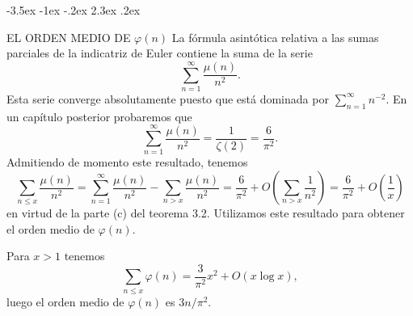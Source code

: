 \documentclass[12pt,a4paper]{book}
\makeatletter
\renewcommand\section{\@startsection{section}{1}{\z@}%
  {-3.5ex \@plus -1ex \@minus -.2ex}%
  {2.3ex \@plus .2ex}%
  {\normalfont\Large\bfseries\raggedright}}
\makeatother
\begin{document}
    \section{EL ORDEN MEDIO DE \texorpdfstring{$\varphi(n)$}{φ(n)}}
    La fórmula asintótica relativa a las sumas parciales de la indicatriz de Euler
    contiene la suma de la serie
    \begin{equation*}
        \sum_{n=1}^{\infty}\frac{\mu(n)}{n^{2}}.
    \end{equation*}
    Esta serie converge absolutamente puesto que está dominada por
    $\sum_{n=1}^{\infty}n^{-2}$. En un capítulo posterior probaremos que
    \begin{equation}
        \sum_{n=1}^{\infty}\frac{\mu(n)}{n^{2}}=\frac{1}{\zeta(2)}=\frac{6}{\pi^{2}}.
    \end{equation}
    Admitiendo de momento este resultado, tenemos
    \begin{equation*}
        \sum_{n\leq x}\frac{\mu(n)}{n^{2}}=\sum_{n=1}^{\infty}\frac{\mu(n)}{n^{2}}
        -\sum_{n>x}\frac{\mu(n)}{n^{2}}
        =\frac{6}{\pi^{2}}+O\left(\sum_{n>x}\frac{1}{n^{2}}\right)=\frac{6}{\pi^{2}}+O\left(\frac{1}{x}\right)
    \end{equation*}
    en virtud de la parte (c) del teorema 3.2. Utilizamos este resultado para obtener el
    orden medio de $\varphi(n)$.

    \begin{teorema}
        Para $x>1$ tenemos
        \begin{equation}
            \sum_{n\leq x}\varphi(n)=\frac{3}{\pi^{2}}x^{2}+O(x\log x),
        \end{equation}
        luego el orden medio de $\varphi(n)$ es $3n/\pi^{2}$.
    \end{teorema}
\end{document}

